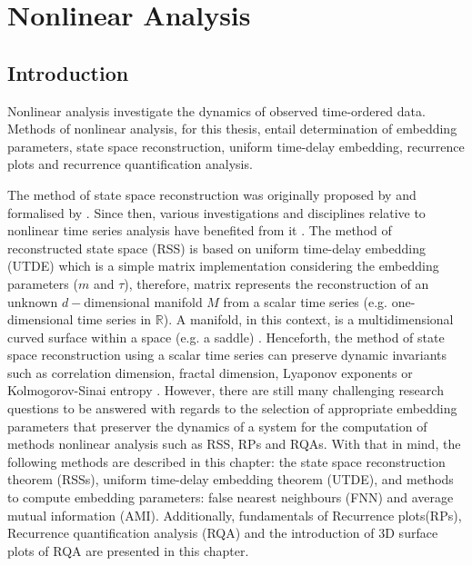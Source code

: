 \chapter{Nonlinear Analysis} \label{chapter3}

%
\graphicspath{{figs/chapter3/PDF/}}

\section{Introduction}
Nonlinear analysis investigate the dynamics of observed time-ordered data.
Methods of nonlinear analysis, for this thesis, entail determination 
of embedding parameters, state space reconstruction, uniform time-delay
embedding, recurrence plots and recurrence quantification analysis. 

The method of state space reconstruction was originally proposed by 
\cite{packard1980} and formalised by \cite{takens1981}. Since then, various 
investigations and disciplines relative to nonlinear time series analysis 
have benefited from it \citep{aguirre2009, stergiou2011, frank2010, sama2013}.
The method of reconstructed state space (RSS) is based on uniform time-delay 
embedding (UTDE) which is a simple matrix implementation considering the 
embedding 
parameters ($m$ and $\tau$), therefore, matrix represents the reconstruction
of an unknown $d-$dimensional manifold $M$ from a scalar 
time series (e.g. one-dimensional time series in $\mathbb{R}$).
A manifold, in this context, is a multidimensional curved surface within a 
space (e.g. a saddle) \citep{guastello-gregson2011}.
Henceforth, the method of state space reconstruction using a scalar time series 
can preserve dynamic invariants such as correlation dimension, 
fractal dimension, Lyaponov exponents or Kolmogorov-Sinai entropy 
\citep{bradley2015, Quintana-Duque2012, 
Quintana-Duque2013, Quintana-Duque2016, krakovska2015}.
However, 
there are still many challenging research questions to be answered  
with regards to the selection of appropriate embedding parameters 
that preserver the dynamics of a system 
for the computation of methods nonlinear analysis such as RSS, RPs and RQAs.
With that in mind, the following methods are described in this chapter: 
the state space reconstruction theorem (RSSs), 
uniform time-delay embedding theorem (UTDE), and
methods to compute embedding parameters: 
false nearest neighbours (FNN)
and average mutual information (AMI).
Additionally, fundamentals of Recurrence plots(RPs), 
Recurrence quantification analysis (RQA)
and the introduction of 3D surface plots of RQA
are presented in this chapter.

